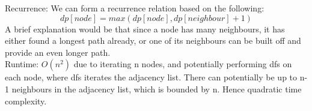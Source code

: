 \documentclass[12pt,letterpaper]{article}
\begin{document}
\begin{enumerate}
    Recurrence: We can form a recurrence relation based on the following: \\
    \[
       dp[node] = max(dp[node], dp[neighbour] + 1)
    \]
    A brief explanation would be that since a node has many neighbours,
    it has either found a longest path already, or one of its neighbours can be built off and provide an even longer path. \\
    
    Runtime: $O(n^2)$ due to iterating n nodes, 
    and potentially performing dfs on each node, where dfs iterates the adjacency list. 
    There can potentially be up to n-1 neighbours in the adjacency list, which is bounded by n. Hence quadratic time complexity.
\end{enumerate}
\end{document}
